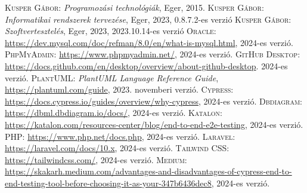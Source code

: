 \documentclass[]{thesis-ekf}
\theoremstyle{definition}
\theoremstyle{remark}
\begin{document}
	\begin{thebibliography}{2}
		\textsc{Kusper Gábor}: \emph{Programozási technológiák}, Eger, 2015.
		\textsc{Kusper Gábor}: \emph{Informatikai rendszerek tervezése}, Eger, 2023, 0.8.7.2-es verzió
		\textsc{Kusper Gábor}: \emph{Szoftvertesztelés}, Eger, 2023, 2023.10.14-es verzió
		\textsc{Oracle}: \url{https://dev.mysql.com/doc/refman/8.0/en/what-is-mysql.html}, 2024-es verzió.
		\textsc{PhpMyAdmin}: \url{https://www.phpmyadmin.net/}, 2024-es verzió.
		\textsc{GitHub Desktop}: \url{https://docs.github.com/en/desktop/overview/about-github-desktop}. 2024-es verzió.
		\textsc{PlantUML}: \emph{PlantUML Language Reference Guide}, \url{https://plantuml.com/guide}, 2023. novemberi verzió.
		\textsc{Cypress}: \url{https://docs.cypress.io/guides/overview/why-cypress}, 2024-es verzió.
		\textsc{Dbdiagram}: \url{https://dbml.dbdiagram.io/docs/}, 2024-es verzió.
		\textsc{Katalon}: \url{https://katalon.com/resources-center/blog/end-to-end-e2e-testing}, 2024-es verzió.
		\textsc{PHP}: \url{https://www.php.net/docs.php}, 2024-es verzió.
		\textsc{Laravel:} \url{https://laravel.com/docs/10.x}, 2024-es verzió.
		\textsc{Tailwind CSS:} \url{https://tailwindcss.com/}, 2024-es verzió.
		\textsc{Medium:} \url{https://skakarh.medium.com/advantages-and-disadvantages-of-cypress-end-to-end-testing-tool-before-choosing-it-as-your-347b6436dec8}, 2024-es verzió.
	\end{thebibliography}
	
\end{document}
